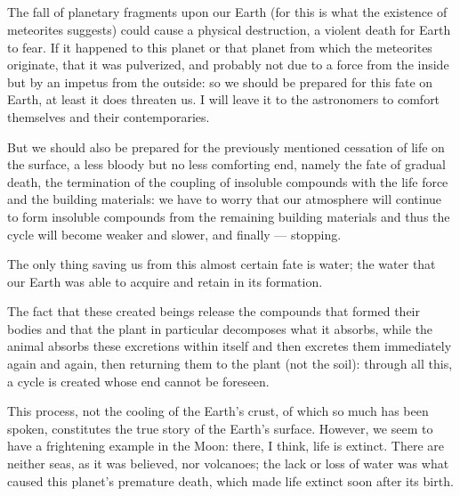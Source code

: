 \documentclass[a4paper, 12pt, oneside]{article}
\begin{document}
\subsection{}
\paragraph*{}
The fall of planetary fragments upon our Earth (for this is what the existence of meteorites suggests) could cause a physical destruction, a violent death for Earth to fear. If it happened to this planet or that planet from which the meteorites originate, that it was pulverized, and probably not due to a force from the inside but by an impetus from the outside: so we should be prepared for this fate on Earth, at least it does threaten us. I will leave it to the astronomers to comfort themselves and their contemporaries.

But we should also be prepared for the previously mentioned cessation of life on the surface, a less bloody but no less comforting end, namely the fate of gradual death, the termination of the coupling of insoluble compounds with the life force and the building materials: we have to worry that our atmosphere will continue to form insoluble compounds from the remaining building materials and thus the cycle will become weaker and slower, and finally --- stopping.

The only thing saving us from this almost certain fate is water; the water that our Earth was able to acquire and retain in its formation.

The fact that these created beings release the compounds that formed their bodies and that the plant in particular decomposes what it absorbs, while the animal absorbs these excretions within itself and then excretes them immediately again and again, then returning them to the plant (not the soil): through all this, a cycle is created whose end cannot be foreseen.

This process, not the cooling of the Earth's crust, of which so much has been spoken, constitutes the true story of the Earth's surface. However, we seem to have a frightening example in the Moon: there, I think, life is extinct. There are neither seas, as it was believed, nor volcanoes; the lack or loss of water was what caused this planet's premature death, which made life extinct soon after its birth.
\end{document}
